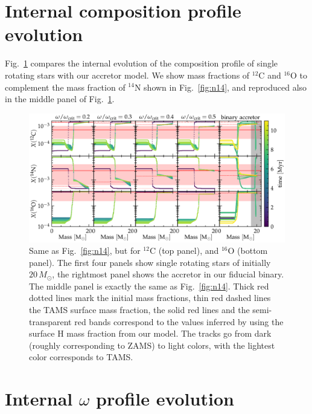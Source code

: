 \documentclass[twocolumn,twocolappendix,trackchanges]{aastex63}
\DeclareRobustCommand{\Figref}[1]{Fig.~\ref{#1}}
\begin{document}
\section{Internal composition profile evolution}
\label{sec:X_fig}


\Figref{fig:composition_huge} compares the internal evolution of the composition
profile of single rotating stars with our accretor model.
We show mass fractions of $^{12}\mathrm{C}$  and $^{16}\mathrm{O}$ to complement the
mass fraction of $^{14}\mathrm{N}$ shown in \Figref{fig:n14}, and
reproduced also in the middle panel of \Figref{fig:composition_huge}.


\begin{figure}[hp]
  \centering
  \includegraphics[width=\textwidth]{huge_composition}
  \caption{Same as \Figref{fig:n14}, but for $^{12}\mathrm{C}$ (top
    panel), and $^{16}\mathrm{O}$ (bottom panel). The first four
    panels show single rotating stars of initially $20\,M_\odot$, the
    rightmost panel shows the accretor in our fiducial binary. The middle panel is
    exactly the same as \Figref{fig:n14}. Thick red dotted lines mark the
    initial mass fractions, thin red dashed lines the TAMS surface mass
    fraction, the solid red lines and the semi-transparent red bands
    correspond to the values inferred by 
    using the surface H mass fraction from our model. The tracks go
    from dark (roughly corresponding to ZAMS) to light colors, with the
    lightest color corresponds to TAMS.}
  \label{fig:composition_huge}
\end{figure}

\section{Internal $\omega$ profile evolution}
\label{sec:omega_fig}
\end{document}
